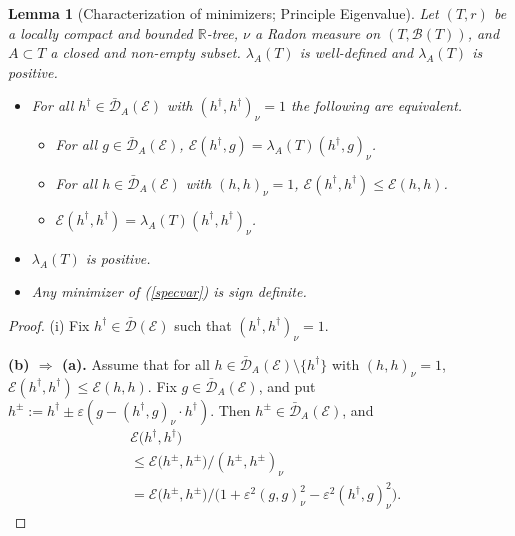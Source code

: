 \documentclass[11pt]{amsart}
\numberwithin{equation}{section}
\newtheorem{lemma}[definition]{Lemma}
\begin{document}
{\begin{lemma}[Characterization of minimizers; Principle Eigenvalue]
Let $(T,r)$ be a locally compact and bounded ${{\mathbb R}}$-tree,
$\nu$ a Radon measure on $(T,{\mathcal B}(T))$, and $A\subset T$ a closed and non-empty subset. \label{L:06}
$\lambda_A(T)$ is well-defined and $\lambda_A(T)$ is positive.
\begin{itemize}
\item[(i)] For all $h^\dagger\in\bar{\mathcal D}_A(\mathcal E)$ with $(h^\dagger,h^\dagger)_{\nu}=1$ the following are equivalent.
\begin{itemize}
\item[(a)] For all $g\in\bar{\mathcal D}_{A}({\mathcal E})$,
$\mathcal E(h^\dagger,g)=\lambda_A(T)(h^\dagger,g)_{\nu}$.
\item[(b)] For all $h\in\bar{{\mathcal D}}_{A}(\mathcal E)$ with $(h,h)_{\nu}=1$,
${\mathcal E}(h^\dagger,h^\dagger)\le{\mathcal E}(h,h)$.
\item[(c)] ${\mathcal E}(h^\dagger,h^\dagger)=\lambda_A(T)(h^\dagger,h^\dagger)_\nu$.
\end{itemize}
\item[(ii)] $\lambda_A(T)$ is positive.
\item[(iii)] Any minimizer of (\ref{specvar}) is sign definite.
\end{itemize}
\end{lemma}{\smallskip}

\begin{proof}
(i)  Fix $h^\dagger\in\bar{\mathcal D}({\mathcal E})$ such that $(h^\dagger,h^\dagger)_\nu=1$. {\smallskip}

{\bf (b) $\Longrightarrow$ (a).}
Assume that for all $h\in\bar{\mathcal D}_{A}({\mathcal E})\setminus\{h^\dagger\}$ with $(h,h)_\nu=1$, {${\mathcal E}(h^\dagger,h^\dagger)\le{\mathcal E}(h,h)$}.
Fix
$g\in\bar{\mathcal D}_A({\mathcal E})$, and put $h^{\pm}:=h^\dagger\pm\varepsilon (g-(h^\dagger,g)_{\nu}\cdot h^\dagger)$.
Then $h^\pm\in\bar{\mathcal D}_A({\mathcal E})$, and
{\begin{equation}\label{emindag}
\begin{aligned}
   &{\mathcal E}\big(h^\dagger,h^\dagger\big)
  \\
 &\le
   {\mathcal E}\big(h^{\pm},h^{\pm}\big)/ (h^\pm,h^\pm)_\nu
  \\
 &=
   {\mathcal E}\big(h^{\pm},h^{\pm}\big)/ \big(1+\varepsilon^2(g,g)^2_\nu-\varepsilon^2(h^\dagger,g)^2_\nu\big).
\end{aligned}
\end{equation}}


\end{proof}}
\end{document}
